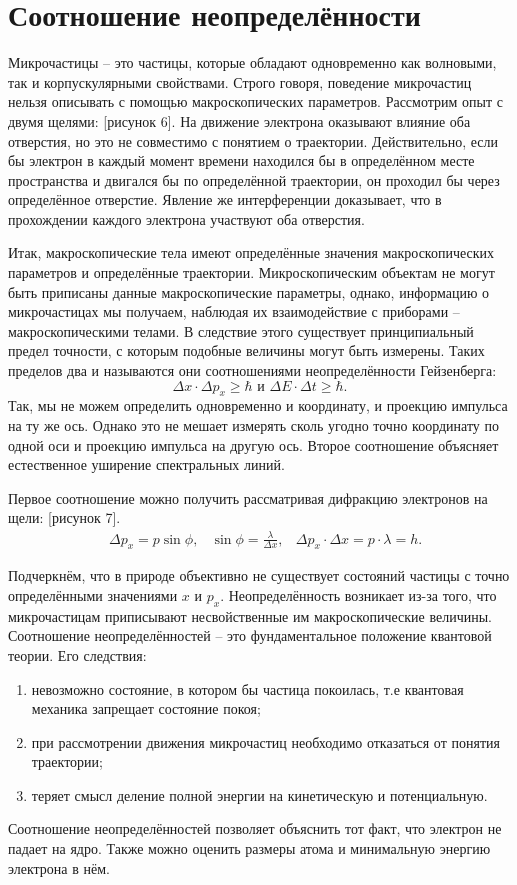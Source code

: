 \section{Соотношение неопределённости}
Микрочастицы -- это частицы, которые обладают одновременно как волновыми, так и
корпускулярными свойствами. Строго говоря, поведение микрочастиц нельзя
описывать с помощью макроскопических параметров. Рассмотрим опыт с двумя щелями:
[рисунок 6]. На движение электрона оказывают влияние оба отверстия, но это не
совместимо с понятием о траектории. Действительно, если бы электрон в каждый
момент времени находился бы в определённом месте пространства и двигался бы по
определённой траектории, он проходил бы через определённое отверстие. Явление же
интерференции доказывает, что в прохождении каждого электрона участвуют оба
отверстия.

Итак, макроскопические тела имеют определённые значения макроскопических
параметров и определённые траектории. Микроскопическим объектам не могут быть
приписаны данные макроскопические параметры, однако, информацию о микрочастицах
мы получаем, наблюдая их взаимодействие с приборами -- макроскопическими телами.
В следствие этого существует принципиальный предел точности, с которым подобные
величины могут быть измерены. Таких пределов два и называются они соотношениями
неопределённости Гейзенберга:
\[
    \Delta x \cdot \Delta p_x \ge \hbar \text{ и }
    \Delta E \cdot \Delta t \ge \hbar.
\]
Так, мы не можем определить одновременно и координату, и проекцию импульса на ту
же ось. Однако это не мешает измерять сколь угодно точно координату по одной оси
и проекцию импульса на другую ось. Второе соотношение объясняет естественное
уширение спектральных линий.

Первое соотношение можно получить рассматривая дифракцию электронов на щели:
[рисунок 7].
\begin{align*}
    & \Delta p_x = p \sin\phi,
    & \sin\phi = \frac{\lambda}{\Delta x},
    & \Delta p_x \cdot \Delta x = p \cdot \lambda = h.
\end{align*}

Подчеркнём, что в природе объективно не существует состояний частицы с точно
определёнными значениями \( x \) и \( p_x \). Неопределённость возникает из-за
того, что микрочастицам приписывают несвойственные им макроскопические величины.
Соотношение неопределённостей -- это фундаментальное положение квантовой теории.
Его следствия:
\begin{enumerate}
    \item невозможно состояние, в котором бы частица покоилась, т.е квантовая
        механика запрещает состояние покоя;
    \item при рассмотрении движения микрочастиц необходимо отказаться от
        понятия траектории;
    \item теряет смысл деление полной энергии на кинетическую и потенциальную.
\end{enumerate}

Соотношение неопределённостей позволяет объяснить тот факт, что электрон
не падает на ядро. Также можно оценить размеры атома и минимальную энергию
электрона в нём.

\newpage
